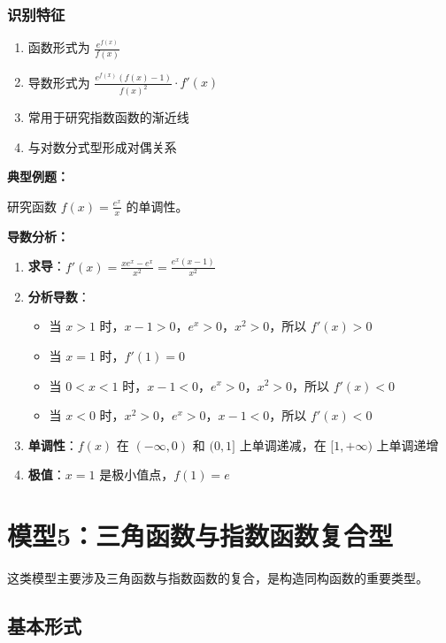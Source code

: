 \documentclass[a4paper,11pt]{ctexrep}
\newcommand{\exampleicon}{\ModeBadge[highlight]{例题}}
\newcommand{\analysisicon}{\ModeBadge[secondary]{分析}}
\theoremstyle{definition}
\begin{document}
\subsubsection{识别特征}

\begin{tipbox}[指数分式型识别要点]
\begin{enumerate}
    \item 函数形式为 $\frac{e^{f(x)}}{f(x)}$
    \item 导数形式为 $\frac{e^{f(x)}(f(x)-1)}{f(x)^2} \cdot f'(x)$
    \item 常用于研究指数函数的渐近线
    \item 与对数分式型形成对偶关系
\end{enumerate}
\end{tipbox}

\exampleicon \textbf{典型例题：}

研究函数 $f(x) = \frac{e^x}{x}$ 的单调性。

\analysisicon \textbf{导数分析：}

\begin{enumerate}
    \item \textbf{求导}：$f'(x) = \frac{xe^x - e^x}{x^2} = \frac{e^x(x-1)}{x^2}$
    \item \textbf{分析导数}：
    \begin{itemize}
        \item 当 $x > 1$ 时，$x-1 > 0$，$e^x > 0$，$x^2 > 0$，所以 $f'(x) > 0$
        \item 当 $x = 1$ 时，$f'(1) = 0$
        \item 当 $0 < x < 1$ 时，$x-1 < 0$，$e^x > 0$，$x^2 > 0$，所以 $f'(x) < 0$
        \item 当 $x < 0$ 时，$x^2 > 0$，$e^x > 0$，$x-1 < 0$，所以 $f'(x) < 0$
    \end{itemize}
    \item \textbf{单调性}：$f(x)$ 在 $(-\infty, 0)$ 和 $(0, 1]$ 上单调递减，在 $[1, +\infty)$ 上单调递增
    \item \textbf{极值}：$x = 1$ 是极小值点，$f(1) = e$
\end{enumerate}

\section{模型5：三角函数与指数函数复合型}

这类模型主要涉及三角函数与指数函数的复合，是构造同构函数的重要类型。

\subsection{基本形式}
\end{document}
